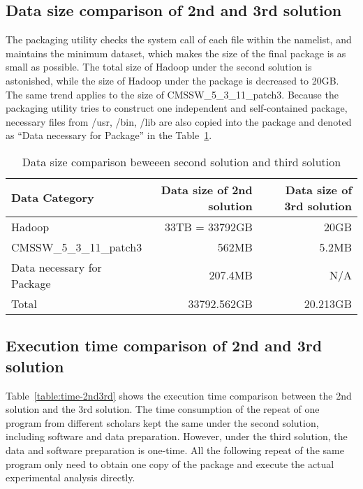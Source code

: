 \documentclass{article}
\begin{document}
\subsection{ Data size comparison of 2nd and 3rd solution}
\indent The packaging utility checks the system call of each file within the namelist, and maintains the minimum dataset, which makes the size of the final package is as small as possible. The total size of Hadoop under the second solution is astonished, while the size of Hadoop under the package is decreased to 20GB. The same trend applies to the size of CMSSW\_5\_3\_11\_patch3. Because the packaging utility tries to construct one independent and self-contained package, necessary files  from /usr, /bin, /lib are also copied into the package and denoted as “Data necessary for Package” in the Table~\ref{table:datasize-2nd3rd}.

\begin{table}
    \centering
    \begin{tabular}{|l|r|r|}
    \hline
     Data Category & Data size of 2nd solution & Data size of 3rd solution \\ \hline
     Hadoop & 33TB = 33792GB & 20GB \\ \hline
     CMSSW\_5\_3\_11\_patch3 & 562MB & 5.2MB \\ \hline
     Data necessary for Package & 207.4MB & N/A \\ \hline
     Total & 33792.562GB & 20.213GB \\ \hline
    \end{tabular}
    \caption{Data size comparison beweeen second solution and third solution}
    \label{table:datasize-2nd3rd}
\end{table}

\subsection{Execution time comparison of 2nd and 3rd solution}
\indent Table~\ref{table:time-2nd3rd} shows the execution time comparison between the 2nd solution and the 3rd solution. The time consumption of the repeat of one program from different scholars kept the same under the second solution, including software and data preparation. However, under the third solution, the data and software preparation is one-time. All the following repeat of the same program only need to obtain one copy of the package and execute the actual experimental analysis directly.
\end{document}
